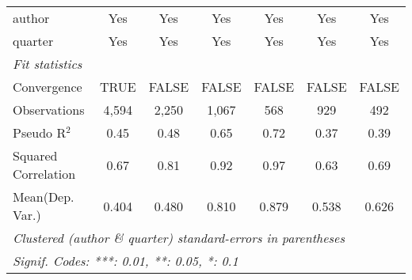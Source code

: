 \begin{tabular}{lcccccc}
   author                                                     & Yes          & Yes           & Yes           & Yes           & Yes          & Yes\\  
   quarter                                                    & Yes          & Yes           & Yes           & Yes           & Yes          & Yes\\  
   \midrule
   \emph{Fit statistics}\\
   Convergence                                                &TRUE          & FALSE         & FALSE         & FALSE         & FALSE        & FALSE\\  
   Observations                                               & 4,594        & 2,250         & 1,067         & 568           & 929          & 492\\  
   Pseudo R$^2$                                               & 0.45         & 0.48          & 0.65          & 0.72          & 0.37         & 0.39\\  
   Squared Correlation                                        & 0.67         & 0.81          & 0.92          & 0.97          & 0.63         & 0.69\\  
Mean(Dep. Var.) & 0.404 & 0.480 & 0.810 & 0.879 & 0.538 & 0.626 \\
   \midrule \midrule
   \multicolumn{7}{l}{\emph{Clustered (author \& quarter) standard-errors in parentheses}}\\
   \multicolumn{7}{l}{\emph{Signif. Codes: ***: 0.01, **: 0.05, *: 0.1}}\\
\end{tabular}
\par\endgroup
